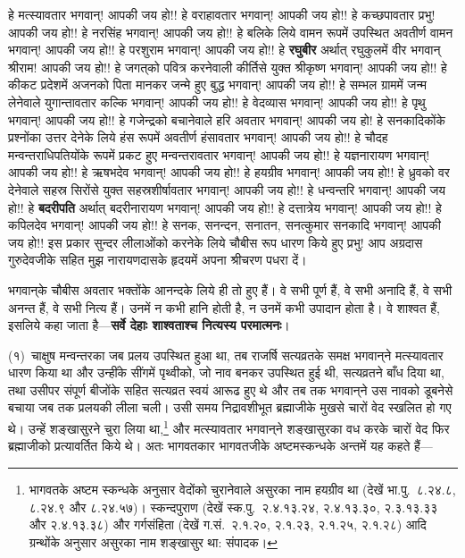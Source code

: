 \begin{sloppypar}\justifying{}
हे मत्स्यावतार भगवान्! आपकी जय हो!! हे वराहावतार भगवान्! आपकी जय हो!! हे कच्छपावतार प्रभु! आपकी जय हो!! हे नरसिंह भगवान्! आपकी जय हो!! हे बलिके लिये वामन रूपमें उपस्थित अवतीर्ण वामन भगवान्! आपकी जय हो!! हे परशुराम भगवान्! आपकी जय हो!! हे \textbf{रघुबीर} अर्थात् रघुकुलमें वीर भगवान् श्रीराम! आपकी जय हो!! हे जगत्‌को पवित्र करनेवाली कीर्तिसे युक्त श्रीकृष्ण भगवान्! आपकी जय हो!! हे कीकट प्रदेशमें अजनको पिता मानकर जन्मे हुए बुद्ध भगवान्! आपकी जय हो!! हे सम्भल ग्राममें जन्म लेनेवाले युगान्तावतार कल्कि भगवान्! आपकी जय हो!! हे वेदव्यास भगवान्! आपकी जय हो!! हे पृथु भगवान्! आपकी जय हो!! हे गजेन्द्रको बचानेवाले हरि अवतार भगवान्! आपकी जय हो! हे सनकादिकोंके प्रश्नोंका उत्तर देनेके लिये हंस रूपमें अवतीर्ण हंसावतार भगवान्! आपकी जय हो!! हे चौदह मन्वन्तराधिपतियोंके रूपमें प्रकट हुए मन्वन्तरावतार भगवान्! आपकी जय हो!! हे यज्ञनारायण भगवान्! आपकी जय हो!! हे ऋषभदेव भगवान्! आपकी जय हो!! हे हयग्रीव भगवान्! आपकी जय हो!! हे ध्रुवको वर देनेवाले सहस्र सिरोंसे युक्त सहस्रशीर्षावतार भगवान्! आपकी जय हो!! हे धन्वन्तरि भगवान्! आपकी जय हो!! हे \textbf{बदरीपति} अर्थात् बदरीनारायण भगवान्! आपकी जय हो!! हे दत्तात्रेय भगवान्! आपकी जय हो!! हे कपिलदेव भगवान्! आपकी जय हो!! हे सनक, सनन्दन, सनातन, सनत्कुमार सनकादि भगवान्! आपकी जय हो!! इस प्रकार सुन्दर लीलाओंको करनेके लिये चौबीस रूप धारण किये हुए प्रभु! आप अग्रदास गुरुदेवजीके सहित मुझ नारायणदासके हृदयमें अपना श्रीचरण पधरा दें।
\end{sloppypar}
\begin{sloppypar}\justifying{}
भगवान्‌के चौबीस अवतार भक्तोंके आनन्दके लिये ही तो हुए हैं। वे सभी पूर्ण हैं, वे सभी अनादि हैं, वे सभी अनन्त हैं, वे सभी नित्य हैं। उनमें न कभी हानि होती है, न उनमें कभी उपादान होता है। वे शाश्वत हैं, इसलिये कहा जाता है—\textbf{सर्वे देहाः शाश्वताश्च नित्यस्य परमात्मनः}।
\end{sloppypar}
\begin{sloppypar}\justifying{}
(१)~चाक्षुष मन्वन्तरका जब प्रलय उपस्थित हुआ था, तब राजर्षि सत्यव्रतके समक्ष भगवान्‌ने मत्स्यावतार धारण किया था और उन्हींके सींगमें पृथ्वीको, जो नाव बनकर उपस्थित हुई थी, सत्यव्रतने बाँध दिया था, तथा उसीपर संपूर्ण बीजोंके सहित सत्यव्रत स्वयं आरूढ हुए थे और तब तक भगवान्‌ने उस नावको डूबनेसे बचाया जब तक प्रलयकी लीला चली। उसी समय निद्रावशीभूत ब्रह्माजीके मुखसे चारों वेद स्खलित हो गए थे। उन्हें शङ्खासुरने चुरा लिया था,\footnote{भागवतके अष्टम स्कन्धके अनुसार वेदोंको चुरानेवाले असुरका नाम हयग्रीव था (देखें भा.पु.~८.२४.८, ८.२४.९ और ८.२४.५७)। स्कन्दपुराण (देखें स्क.पु.~२.४.१३.२४, २.४.१३.३०, २.३.१३.३३ और २.४.१३.३८) और गर्गसंहिता (देखें ग.सं.~२.१.२०, २.१.२३, २.१.२५, २.१.२८) आदि ग्रन्थोंके अनुसार असुरका नाम शङ्खासुर था: संपादक।} और मत्स्यावतार भगवान्‌ने शङ्खासुरका वध करके चारों वेद फिर ब्रह्माजीको प्रत्यावर्तित किये थे। अतः भागवतकार भागवतजीके अष्टमस्कन्धके अन्तमें यह कहते हैं—
\end{sloppypar}

